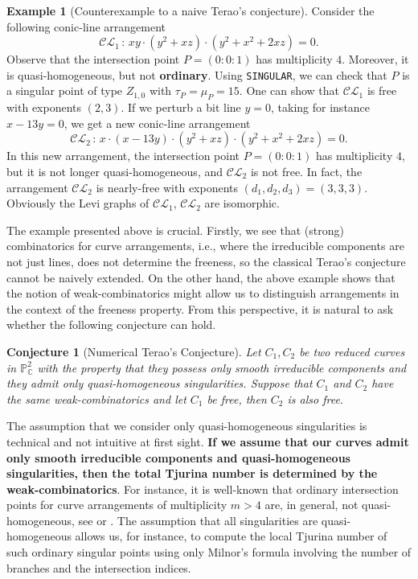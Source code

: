 \documentclass[12pt]{article}
\theoremstyle{plain}
\newtheorem{conjecture}[thm]{Conjecture}
\theoremstyle{definition}
\newtheorem{example}[thm]{Example}
\begin{document}
\begin{example}[Counterexample to a naive Terao's conjecture]
Consider the following conic-line arrangement
$$\mathcal{CL}_{1} \, : \, xy\cdot(y^{2} + xz)\cdot(y^{2}+x^{2} + 2xz)=0.$$
Observe that the intersection point $P = (0:0:1)$ has multiplicity $4$. Moreover, it is quasi-homogeneous, but not \textbf{ordinary}. Using \verb}SINGULAR}, we can check that $P$ is a singular point of type $Z_{1,0}$ with $\tau_{P}=\mu_{P}=15$. One can show that $\mathcal{CL}_{1}$ is free with exponents $(2,3)$. If we perturb a bit line $y=0$, taking for instance $x-13y = 0$, we get a new conic-line arrangement 
$$\mathcal{CL}_{2} \, : \, x\cdot(x-13y)\cdot(y^{2} + xz)\cdot(y^{2}+x^{2} + 2xz)=0.$$
In this new arrangement, the intersection point $P=(0:0:1)$ has multiplicity $4$, but it is not longer quasi-homogeneous, and $\mathcal{CL}_{2}$ is not free. In fact, the arrangement $\mathcal{CL}_{2}$ is nearly-free with exponents $(d_{1},d_{2},d_{3}) = (3,3,3)$. Obviously the Levi graphs of $\mathcal{CL}_{1}$, $\mathcal{CL}_{2}$ are isomorphic.
\end{example}
The example presented above is crucial. Firstly, we see that (strong) combinatorics for curve arrangements, i.e., where the irreducible components are not just lines, does not determine the freeness, so the classical Terao's conjecture cannot be naively extended. On the other hand, the above example shows that the notion of weak-combinatorics might allow us to distinguish arrangements in the context of the freeness property. From this perspective, it is natural to ask whether the following conjecture can hold.

\begin{conjecture}[Numerical Terao's Conjecture]
Let $C_{1}, C_{2}$ be two reduced curves in $\mathbb{P}^{2}_{\mathbb{C}}$ with the property that they possess only smooth irreducible components and they admit only quasi-homogeneous singularities. Suppose that $C_{1}$ and $C_{2}$ have the same weak-combinatorics and let $C_{1}$ be free, then $C_{2}$ is also free.
\end{conjecture}
The assumption that we consider only quasi-homogeneous singularities is technical and not intuitive at first sight. \textbf{If we assume that our curves admit only smooth irreducible components and quasi-homogeneous singularities, then the total Tjurina number is determined by the weak-combinatorics}. For instance, it is well-known that ordinary intersection points for curve arrangements of multiplicity $m>4$ are, in general, not quasi-homogeneous, see \cite[Example 4.2]{STo} or \cite[Exercise 7.31]{RCS}. The assumption that all singularities are quasi-homogeneous allows us, for instance, to compute the local Tjurina number of such ordinary singular points using only Milnor's formula involving the number of branches and the intersection indices.
\end{document}
